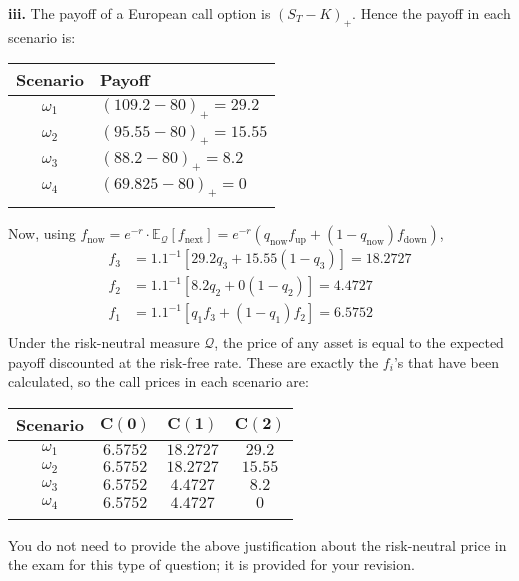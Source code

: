 \documentclass[11pt]{article}
\begin{document}
	\noindent \textbf{iii. } 
	The payoff of a European call option is $(S_{T} - K)_{+}$. Hence the payoff in each scenario is:
	\begin{center}
		\begin{tabular}{cl}
			\textbf{Scenario} & \textbf{    Payoff}\\
			\hline
			\hline
			$\omega_{1}$ & $(109.2 - 80)_{+} = 29.2$\\
			\hline
			$\omega_{2}$ & $(95.55 - 80)_{+} = 15.55$\\
			\hline
			$\omega_{3}$ & $(88.2 - 80)_{+} = 8.2$\\
			\hline
			$\omega_{4}$ & $(69.825 - 80)_{+} = 0$\\
			\hline
			\\
		\end{tabular}
	\end{center}
	Now, using $f_{\text{now}} = e^{-r}\cdot\mathbb{E}_{\mathcal{Q}}[f_{\text{next}}] = e^{-r}(q_{\text{now}}f_{\text{up}} +(1-q_{\text{now}})f_{\text{down}})$, \\
	\begin{align*}
		f_{3} & = 1.1^{-1}\left[29.2q_{3} + 15.55(1 - q_{3})\right] = 18.2727\\
		f_{2} & = 1.1^{-1}\left[8.2q_{2} + 0(1-q_{2})\right] = 4.4727\\
		f_{1} & = 1.1^{-1}\left[q_{1}f_{3} + (1 - q_{1})f_{2}\right] = 6.5752\\
		\end{align*} 
	Under the risk-neutral measure $\bm{\mathcal{Q}}$, the price of any asset is equal to the expected payoff discounted at the risk-free rate. These are exactly the $f_{i}$'s that have been calculated, so the call prices in each scenario are:
	\begin{center}
		\begin{tabular}{cccc}
			\textbf{Scenario}  & $\bm{C(0)}$ & $\bm{C(1)}$ & $\bm{C(2)}$ \\
			\hline
			\hline
			$\omega_{1}$ & $6.5752$ & $18.2727$  & $29.2$ \\
			\hline
			$\omega_{2}$ & $6.5752$ & $18.2727$  & $15.55$ \\
			\hline
			$\omega_{3}$ & $6.5752$ & $4.4727$  & $8.2$ \\
			\hline
			$\omega_{4}$ & $6.5752$ & $4.4727$  & $0$ \\
			\hline
			\\
			\end{tabular}
		\end{center}
	You do not need to provide the above justification about the risk-neutral price in the exam for this type of question; it is provided for your revision.
	
\end{document}
